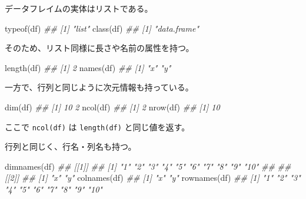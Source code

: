\documentclass[
  letterpaper,
  xelatex,
  ja=standard, xelatex]{bxjsbook}
\newenvironment{Shaded}{\begin{snugshade}}{\end{snugshade}}
\newcommand{\DocumentationTok}[1]{\textcolor[rgb]{0.37,0.37,0.37}{\textit{#1}}}
\newcommand{\FunctionTok}[1]{\textcolor[rgb]{0.28,0.35,0.67}{#1}}
\newcommand{\NormalTok}[1]{\textcolor[rgb]{0.00,0.23,0.31}{#1}}
\begin{document}
\begin{Shaded}
\end{Shaded}

データフレイムの実体はリストである。

\begin{Shaded}
\begin{Highlighting}[]
\FunctionTok{typeof}\NormalTok{(df)}
\DocumentationTok{\#\# [1] "list"}
\FunctionTok{class}\NormalTok{(df)}
\DocumentationTok{\#\# [1] "data.frame"}
\end{Highlighting}
\end{Shaded}

そのため、リスト同様に長さや名前の属性を持つ。

\begin{Shaded}
\begin{Highlighting}[]
\FunctionTok{length}\NormalTok{(df)}
\DocumentationTok{\#\# [1] 2}
\FunctionTok{names}\NormalTok{(df)}
\DocumentationTok{\#\# [1] "x" "y"}
\end{Highlighting}
\end{Shaded}

一方で、行列と同じように次元情報も持っている。

\begin{Shaded}
\begin{Highlighting}[]
\FunctionTok{dim}\NormalTok{(df)}
\DocumentationTok{\#\# [1] 10  2}
\FunctionTok{ncol}\NormalTok{(df)}
\DocumentationTok{\#\# [1] 2}
\FunctionTok{nrow}\NormalTok{(df)}
\DocumentationTok{\#\# [1] 10}
\end{Highlighting}
\end{Shaded}

ここで \texttt{ncol(df)} は \texttt{length(df)} と同じ値を返す。

行列と同じく、行名・列名も持つ。

\begin{Shaded}
\begin{Highlighting}[]
\FunctionTok{dimnames}\NormalTok{(df)}
\DocumentationTok{\#\# [[1]]}
\DocumentationTok{\#\#  [1] "1"  "2"  "3"  "4"  "5"  "6"  "7"  "8"  "9"  "10"}
\DocumentationTok{\#\# }
\DocumentationTok{\#\# [[2]]}
\DocumentationTok{\#\# [1] "x" "y"}
\FunctionTok{colnames}\NormalTok{(df)}
\DocumentationTok{\#\# [1] "x" "y"}
\FunctionTok{rownames}\NormalTok{(df)}
\DocumentationTok{\#\#  [1] "1"  "2"  "3"  "4"  "5"  "6"  "7"  "8"  "9"  "10"}
\end{Highlighting}
\end{Shaded}
\end{document}
